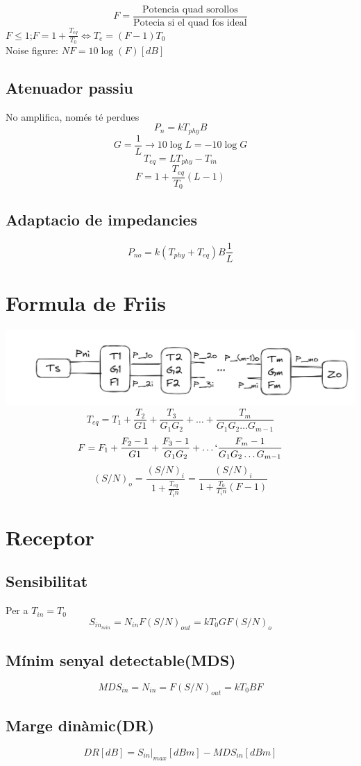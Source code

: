 \documentclass[a4paper,11pt]{article}
\begin{document}
\begin{multicols*}{2}
	$$F=\frac{\text{Potencia quad sorollos}}{\text{Potecia si el quad fos ideal}}$$
	$F\leq1$;$F=1+\frac{T_{eq}}{T_0}\Leftrightarrow T_e=(F-1)T_0$\\
	Noise figure: $NF=10\log(F)[dB]$
	\subsection{Atenuador passiu}
	No amplifica, només té perdues
	$$P_n=kT_{phy}B$$
	$$G=\frac{1}{L}\rightarrow 10\log L=-10\log G$$
	$$T_{eq}=LT_{phy}-T_{in}$$
	$$F= 1+\frac{T_{eq}}{T_0}(L-1)$$
	\subsection{Adaptacio de impedancies}
	$$P_{no}=k(T_{phy}+T_{eq})B\frac{1}{L} $$
	\section{Formula de Friis}
	\includegraphics[width=1\linewidth]{quadcascada.png}
	$$T_{eq}=T_1+\frac{T_2}{G1}+\frac{T_3}{G_1 G_2}+\dots+\frac{T_m}{G_1 G_2\dots G_{m-1}}$$
	$$F=F_1+\frac{F_2-1}{G1}+\frac{F_3-1}{G_1 G_2}+\dots`\frac{F_m-1}{G_1 G_2\dots G_{m-1}}$$
	$$(S/N)_o=\frac{(S/N)_i}{1+\frac{T_{eq}}{T_in}}=\frac{(S/N)_i}{1+\frac{T_0}{T_in}(F-1)}$$
		
	\section{Receptor}
	\subsection{Sensibilitat}
	Per a $T_{in}=T_0$
	$$S_{in_{min}}=N_{in}F(S/N)_{out}=kT_0GF(S/N)_{o}$$
	\subsection{Mínim senyal detectable(MDS)}
	$$MDS_{in}=N_{in}=F(S/N)_{out}=kT_0BF$$
	\subsection{Marge dinàmic(DR)}
	$$DR[dB]=S_{in}|_{max}[dBm]-MDS_{in}[dBm]$$
	 

\end{multicols*}
\end{document}
